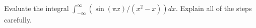 Evaluate the integral $\int_{-\infty}^{\infty}(\sin (\pi
x)/(x^2-x))dx$. Explain all of the steps carefully. 
